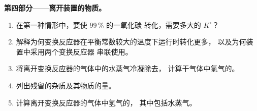 \begin{problem}
\medskip
\noindent\textbf{第四部分——离开装置的物质。}
\begin{enumerate}[resume]
  \item 在第一种情形中，要使 99\,\% 的一氧化碳
        转化，需要多大的 $K^\circ$？
  \item 解释为何变换反应器在平衡常数较大的温度下运行时转化更多，
        以及为何装置中采用两个变换反应器
        串联使用。
  \item 将离开变换反应器的气体中的水蒸气冷凝除去，
        计算干气体中氢气的。
  \item 列出残留的杂质及其物质的量。
  \item 计算离开变换反应器的气体中氢气的，
        其中包括水蒸气。
\end{enumerate}
\end{problem}
